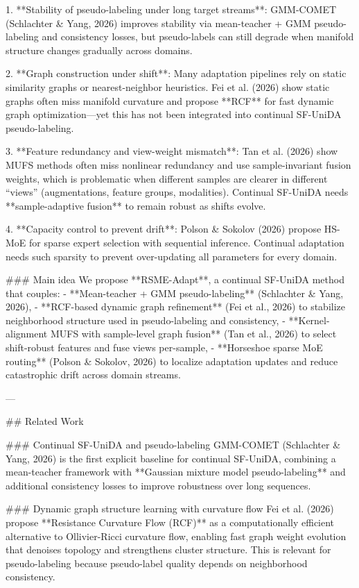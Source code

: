 1. **Stability of pseudo-labeling under long target streams**: GMM-COMET (Schlachter & Yang, 2026) improves stability via mean-teacher + GMM pseudo-labeling and consistency losses, but pseudo-labels can still degrade when manifold structure changes gradually across domains.

2. **Graph construction under shift**: Many adaptation pipelines rely on static similarity graphs or nearest-neighbor heuristics. Fei et al. (2026) show static graphs often miss manifold curvature and propose **RCF** for fast dynamic graph optimization—yet this has not been integrated into continual SF-UniDA pseudo-labeling.

3. **Feature redundancy and view-weight mismatch**: Tan et al. (2026) show MUFS methods often miss nonlinear redundancy and use sample-invariant fusion weights, which is problematic when different samples are clearer in different “views” (augmentations, feature groups, modalities). Continual SF-UniDA needs **sample-adaptive fusion** to remain robust as shifts evolve.

4. **Capacity control to prevent drift**: Polson & Sokolov (2026) propose HS-MoE for sparse expert selection with sequential inference. Continual adaptation needs such sparsity to prevent over-updating all parameters for every domain.

### Main idea  
We propose **RSME-Adapt**, a continual SF-UniDA method that couples:
- **Mean-teacher + GMM pseudo-labeling** (Schlachter & Yang, 2026),
- **RCF-based dynamic graph refinement** (Fei et al., 2026) to stabilize neighborhood structure used in pseudo-labeling and consistency,
- **Kernel-alignment MUFS with sample-level graph fusion** (Tan et al., 2026) to select shift-robust features and fuse views per-sample,
- **Horseshoe sparse MoE routing** (Polson & Sokolov, 2026) to localize adaptation updates and reduce catastrophic drift across domain streams.

---

## Related Work  

### Continual SF-UniDA and pseudo-labeling  
GMM-COMET (Schlachter & Yang, 2026) is the first explicit baseline for continual SF-UniDA, combining a mean-teacher framework with **Gaussian mixture model pseudo-labeling** and additional consistency losses to improve robustness over long sequences.

### Dynamic graph structure learning with curvature flow  
Fei et al. (2026) propose **Resistance Curvature Flow (RCF)** as a computationally efficient alternative to Ollivier-Ricci curvature flow, enabling fast graph weight evolution that denoises topology and strengthens cluster structure. This is relevant for pseudo-labeling because pseudo-label quality depends on neighborhood consistency.


